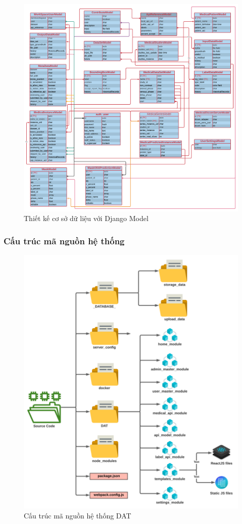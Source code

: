 \begin{figure}[H]
    \centering
    \includegraphics[width=17cm]{images/chapter-07-images/data-base-version-4.pdf}
    \caption{Thiết kế cơ sở dữ liệu với Django Model}
\end{figure}


\subsubsection{Cấu trúc mã nguồn hệ thống}
\begin{figure}[H]
    \centering
    \includegraphics[width=14cm]{images/chapter-07-images/source-code-system.png}
    \caption{Cấu trúc mã nguồn hệ thống DAT}
\end{figure}



